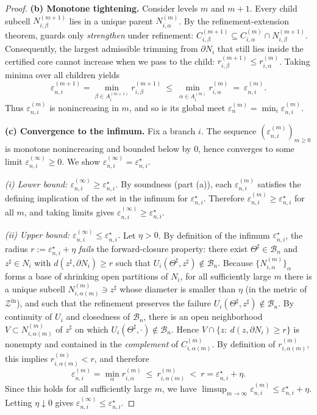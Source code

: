 \documentclass[12pt]{article}
\theoremstyle{definition}
\theoremstyle{plain}
\begin{document}
\begin{proof}
\medskip
\textbf{(b) Monotone tightening.}
Consider levels $m$ and $m+1$. Every child subcell $N_{i,\beta}^{(m+1)}$ lies in a unique
parent $N_{i,\alpha}^{(m)}$. By the refinement-extension theorem, guards only \emph{strengthen} under refinement:
$C_{i,\beta}^{(m+1)} \subseteq C_{i,\alpha}^{(m)}\cap N_{i,\beta}^{(m+1)}$. Consequently, the largest admissible
trimming from $\partial N_i$ that still lies inside the certified core cannot increase when we pass to the child:
$r_{i,\beta}^{(m+1)}\le r_{i,\alpha}^{(m)}$. Taking minima over all children yields
\[
  \varepsilon_{n,i}^{(m+1)}=\min_{\beta\in A_i^{(m+1)}} r_{i,\beta}^{(m+1)}
  \ \le\ 
  \min_{\alpha\in A_i^{(m)}} r_{i,\alpha}^{(m)}
  \ =\ \varepsilon_{n,i}^{(m)}.
\]
Thus $\varepsilon_{n,i}^{(m)}$ is nonincreasing in $m$, and so is its global meet $\varepsilon_n^{(m)}=\min_i \varepsilon_{n,i}^{(m)}$.

\medskip
\textbf{(c) Convergence to the infimum.}
Fix a branch $i$. The sequence $(\varepsilon_{n,i}^{(m)})_{m\ge0}$ is monotone nonincreasing and bounded below by
$0$, hence converges to some limit $\varepsilon_{n,i}^{(\infty)}\ge0$. We show
$\varepsilon_{n,i}^{(\infty)}=\varepsilon_{n,i}^\star$.

\emph{(i) Lower bound: $\varepsilon_{n,i}^{(\infty)}\ge \varepsilon_{n,i}^\star$.}
By soundness (part (a)), each $\varepsilon_{n,i}^{(m)}$ satisfies the defining implication of the set in the infimum
for $\varepsilon_{n,i}^\star$. Therefore $\varepsilon_{n,i}^{(m)}\ge \varepsilon_{n,i}^\star$ for all $m$, and taking
limits gives $\varepsilon_{n,i}^{(\infty)}\ge \varepsilon_{n,i}^\star$.

\emph{(ii) Upper bound: $\varepsilon_{n,i}^{(\infty)}\le \varepsilon_{n,i}^\star$.}
Let $\eta>0$. By definition of the infimum $\varepsilon_{n,i}^\star$, the radius
$r:=\varepsilon_{n,i}^\star+\eta$ \emph{fails} the forward-closure property: there exist
$\Theta^\sharp\in\mathcal B_n$ and $z^\sharp\in N_i$ with $d(z^\sharp,\partial N_i)\ge r$ such that
$U_i(\Theta^\sharp,z^\sharp)\notin\mathcal B_n$.
Because $\{N_{i,\alpha}^{(m)}\}_{\alpha}$ forms a base of shrinking open partitions of $N_i$, for all sufficiently
large $m$ there is a unique subcell $N_{i,\alpha(m)}^{(m)}\ni z^\sharp$ whose diameter is smaller than $\eta$
(in the metric of $\mathcal Z^{\mathrm{in}}$), and such that the refinement preserves the failure $U_i(\Theta^\sharp,z^\sharp)\notin\mathcal B_n$.
By continuity of $U_i$ and closedness of $\mathcal B_n$, there is an open neighborhood $V\subset N_{i,\alpha(m)}^{(m)}$
of $z^\sharp$ on which $U_i(\Theta^\sharp,\cdot)\notin\mathcal B_n$. Hence $V\cap\{z:\ d(z,\partial N_i)\ge r\}$ is
nonempty and contained in the \emph{complement} of $C_{i,\alpha(m)}^{(m)}$. By definition of $r_{i,\alpha(m)}^{(m)}$,
this implies $r_{i,\alpha(m)}^{(m)}<r$, and therefore
\[
  \varepsilon_{n,i}^{(m)}=\min_{\alpha} r_{i,\alpha}^{(m)} \ \le\ r_{i,\alpha(m)}^{(m)} \ <\ r=\varepsilon_{n,i}^\star+\eta.
\]
Since this holds for all sufficiently large $m$, we have
$\limsup_{m\to\infty}\varepsilon_{n,i}^{(m)}\le \varepsilon_{n,i}^\star+\eta$. Letting $\eta\downarrow0$ gives
$\varepsilon_{n,i}^{(\infty)}\le \varepsilon_{n,i}^\star$.


\end{proof}
\end{document}
